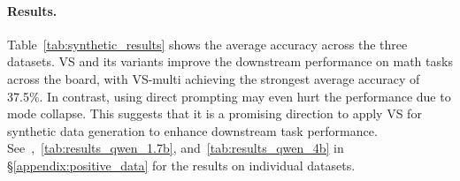 \begin{table*}[t]
    \centering
    \caption{
        Downstream accuracy averaged across MATH500, OlympiadBench and Minerva Math. ``Gen Models'' show the models used to generate the 1K synthetic questions. ``SFT Models'' are the ones used to finetune on the 1K synthetic data. VS and its variants improve the downstream tasks.
    }
    \label{tab:synthetic_results}
\end{table*}

\paragraph{Results.}
Table~\ref{tab:synthetic_results} shows the average accuracy across the three datasets. VS and its variants improve the downstream performance on math tasks across the board, with VS-multi achieving the strongest average accuracy of 37.5\%. In contrast, using direct prompting may even hurt the performance due to mode collapse. This suggests that it is a promising direction to apply VS for synthetic data generation to enhance downstream task performance.  See~,~\ref{tab:results_qwen_1.7b}, and~\ref{tab:results_qwen_4b} in \S\ref{appendix:positive_data} for the results on individual datasets.


